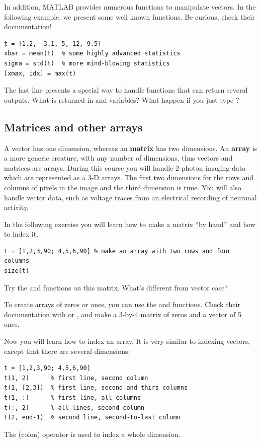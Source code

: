 \documentclass{article}
\begin{document}
In addition,  MATLAB provides numerous functions to manipulate vectors.
In the following example, we present some well known functions.
Be curious, check their documentation!
\begin{lstlisting}
t = [1.2, -3.1, 5, 12, 9.5]
xbar = mean(t)  % some highly advanced statistics
sigma = std(t)  % more mind-blowing statistics
[xmax, idx] = max(t)
\end{lstlisting}
The last line presents a special way to handle functions that can return several outputs.
What is returned in  and  variables?
What happen if you just type ?


\pagebreak
\subsection{Matrices and other arrays}

A vector has one dimension, whereas an \textbf{matrix} has two dimensions.
An \textbf{array} is a more generic creature, with any number of dimensions, thus vectors and matrices are arrays.
During this course you will handle 2-photon imaging data which are represented as a 3-D arrays.
The first two dimensions for the rows and columns of pixels in the image and the third dimension is time.
You will also handle vector data, such as voltage traces from an electrical recording of neuronal activity.

In the following exercise you will learn how to make a matrix ``by hand'' and how to index it.
\begin{lstlisting}
t = [1,2,3,90; 4,5,6,90] % make an array with two rows and four columns
size(t)
\end{lstlisting}
Try the  and  functions on this matrix.
What's different from vector case?

To create arrays of zeros or ones, you can use the  and  functions.
Check their documentation with  or , and make a 3-by-4 matrix of zeros and a vector of 5 ones.

Now you will learn how to index an array.
It is very similar to indexing vectors, except that there are several dimensions:
\begin{lstlisting}
t = [1,2,3,90; 4,5,6,90]
t(1, 2)      % first line, second column
t(1, [2,3])  % first line, second and thirs columns
t(1, :)      % first line, all columns
t(:, 2)      % all lines, second column
t(2, end-1)  % second line, second-to-last column
\end{lstlisting}
The \mcode{:} (colon) operator is used to index a whole dimension.
\end{document}
